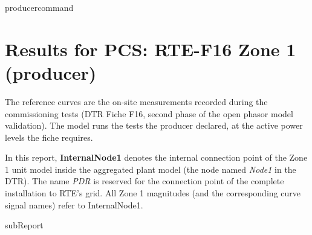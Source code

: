 {{ producercommand }}



    \section{Results for PCS: RTE-F16 Zone 1 ({{producer}})}

    The reference curves are the on-site measurements recorded during the commissioning
    tests (DTR Fiche F16, second phase of the open phasor model validation). The model
    runs the tests the producer declared, at the active power levels the fiche requires.

    In this report, \textbf{InternalNode1} denotes the internal connection point of the
    Zone 1 unit model inside the aggregated plant model (the node named \emph{Node1} in
    the DTR). The name \emph{PDR} is reserved for the connection point of the complete
    installation to RTE's grid. All Zone 1 magnitudes (and the corresponding curve signal
    names) refer to InternalNode1.

    {{subReport}}
    \newpage

